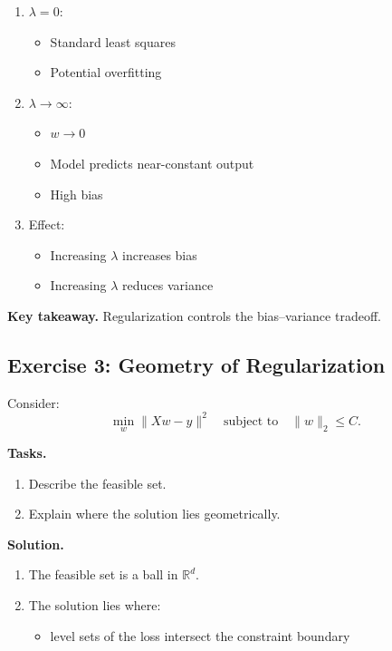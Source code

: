 \begin{enumerate}
\item $\lambda = 0$:
\begin{itemize}
    \item Standard least squares
    \item Potential overfitting
\end{itemize}

\item $\lambda \to \infty$:
\begin{itemize}
    \item $w \to 0$
    \item Model predicts near-constant output
    \item High bias
\end{itemize}

\item Effect:
\begin{itemize}
    \item Increasing $\lambda$ increases bias
    \item Increasing $\lambda$ reduces variance
\end{itemize}
\end{enumerate}

\medskip

\noindent
\textbf{Key takeaway.}  
Regularization controls the bias–variance tradeoff.

\subsection{Exercise 3: Geometry of Regularization}

Consider:
\[
\min_w \|Xw - y\|^2 \quad \text{subject to} \quad \|w\|_2 \leq C.
\]

\medskip

\noindent
\textbf{Tasks.}
\begin{enumerate}
    \item Describe the feasible set.
    \item Explain where the solution lies geometrically.
\end{enumerate}

\medskip

\noindent
\textbf{Solution.}

\begin{enumerate}
\item The feasible set is a ball in $\mathbb{R}^d$.

\item The solution lies where:
\begin{itemize}
    \item level sets of the loss intersect the constraint boundary
\end{itemize}
\end{enumerate}

